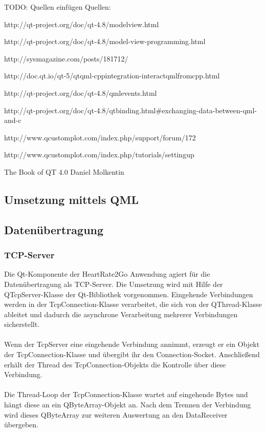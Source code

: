TODO: Quellen einfügen
Quellen:

http://qt-project.org/doc/qt-4.8/modelview.html

http://qt-project.org/doc/qt-4.8/model-view-programming.html

http://sysmagazine.com/posts/181712/

http://doc.qt.io/qt-5/qtqml-cppintegration-interactqmlfromcpp.html

http://qt-project.org/doc/qt-4.8/qmlevents.html

http://qt-project.org/doc/qt-4.8/qtbinding.html\#exchanging-data-between-qml-and-c

http://www.qcustomplot.com/index.php/support/forum/172

http://www.qcustomplot.com/index.php/tutorials/settingup

The Book of QT 4.0 Daniel Molkentin


\subsection{Umsetzung mittels QML}

\subsection{Datenübertragung}
\subsubsection{TCP-Server}
Die Qt-Komponente der HeartRate2Go Anwendung agiert für die Datenübertragung als TCP-Server. Die Umsetzung wird mit Hilfe der QTcpServer-Klasse der Qt-Bibliothek vorgenommen\cite{qtcpserver}. Eingehende Verbindungen werden in der TcpConnection-Klasse verarbeitet, die sich von der QThread-Klasse ableitet und dadurch die asynchrone Verarbeitung mehrerer Verbindungen sicherstellt.\\
\\
Wenn der TcpServer eine eingehende Verbindung annimmt, erzeugt er ein Objekt der TcpConnection-Klasse und übergibt ihr den Connection-Socket. Anschließend erhält der Thread des TcpConnection-Objekts die Kontrolle über diese Verbindung.\\
\\
Die Thread-Loop der TcpConnection-Klasse wartet auf eingehende Bytes und hängt diese an ein QByteArray-Objekt an. Nach dem Trennen der Verbindung wird dieses QByteArray zur weiteren Auswertung an den DataReceiver übergeben.

